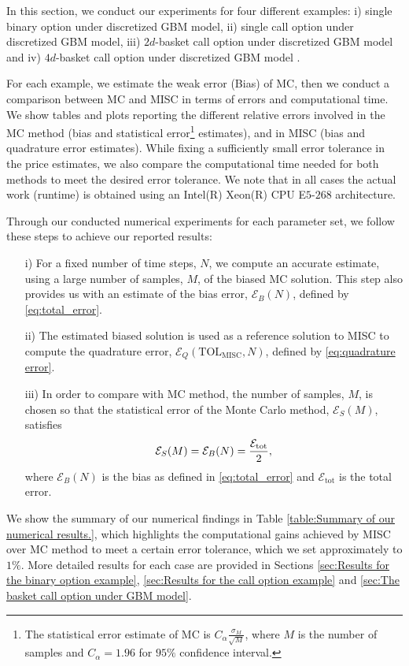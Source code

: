 In this section, we conduct our experiments for four different examples: i) single binary option under discretized GBM model, ii) single call option under discretized GBM model, iii) $2d$-basket call option under discretized GBM model and iv) $4d$-basket call option under discretized GBM model .

For each example, we estimate the weak error  (Bias) of MC, then we conduct a comparison between MC and MISC in terms of errors and computational time. We show tables and plots reporting  the different relative errors involved in the MC method (bias and statistical error\footnote{The statistical error estimate of MC is  $C_{\alpha} \frac{\sigma_M}{\sqrt{M}}$, where $M$ is the number of samples and $C_{\alpha}=1.96$ for $95\%$ confidence interval.}  estimates), and in MISC (bias and quadrature error estimates).  While fixing  a  sufficiently small error tolerance in the price estimates,  we also compare the computational time needed for both methods to meet the desired error tolerance.  We note that  in all cases the actual work (runtime) is obtained using an Intel(R) Xeon(R) CPU E$5$-$268$ architecture. 

Through our conducted numerical experiments for each parameter set, we follow these steps to achieve our reported results:
\begin{enumerate}
\item[i)] For a fixed number of time steps, $N$, we compute an accurate estimate, using a large number of samples, $M$, of the biased  MC solution. This step also provides us with an estimate of the bias error, $\mathcal{E}_B(N)$, defined by \eqref{eq:total_error}. 
\item[ii)] The estimated  biased solution is used as a reference solution  to MISC to compute the quadrature error, $\mathcal{E}_Q(\text{TOL}_{\text{MISC}},N)$, defined by \eqref{eq:quadrature error}.
\item[iii)] In order to compare with MC method, the number of samples, $M$, is chosen so that  the statistical error of the Monte Carlo  method, $\mathcal{E}_S(M)$, satisfies
\begin{align}\label{optimal_number_samples}
\mathcal{E}_S(M)= \mathcal{E}_B(N)=\frac{\mathcal{E}_{\text{tot}}}{2},
\end{align}
where $\mathcal{E}_B(N)$ is the bias as defined in \eqref{eq:total_error} and
$\mathcal{E}_{\text{tot}}$ is the total error. 
\end{enumerate}
We show  the summary of our numerical findings in Table \ref{table:Summary of our numerical results.}, which  highlights the computational gains achieved by MISC over MC method to meet a certain error tolerance, which we set approximately to $1\%$. More detailed results for each case  are provided in  Sections \ref{sec:Results for the binary option example}, \ref{sec:Results for the call option example} and \ref{sec:The basket call option  under GBM  model}.

